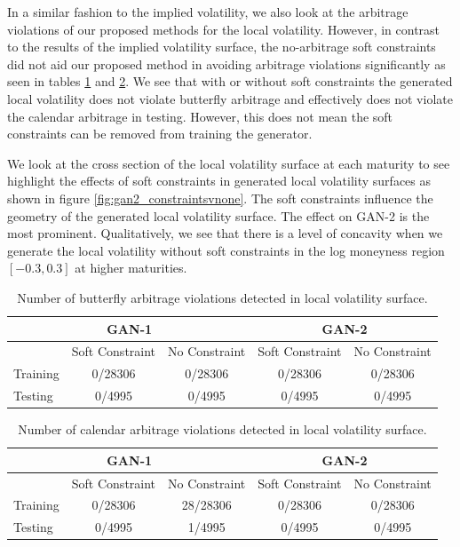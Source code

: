 \documentclass{article}
\theoremstyle{plain}%
\theoremstyle{definition}
\theoremstyle{remark}
\begin{document}
In a similar fashion to the implied volatility, we also look at the arbitrage violations of our proposed methods for the local volatility. However, in contrast to the results of the implied volatility surface, the no-arbitrage soft constraints did not aid our proposed method in avoiding arbitrage violations significantly as seen in tables \ref{tab:butterfly_arbitrage_violations_loc_vol} and \ref{tab:calendar_arbitrage_violation_loc_vols}. We see that with or without soft constraints the generated local volatility does not violate butterfly arbitrage and effectively does not violate the calendar arbitrage in testing. However, this does not mean the soft constraints can be removed from training the generator. 

We look at the cross section of the local volatility surface at each maturity to see highlight the effects of soft constraints in generated local volatility surfaces as shown in figure \ref{fig:gan2_constraintsvnone}. The soft constraints influence the geometry of the generated local volatility surface. The effect on GAN-2 is the most prominent. Qualitatively, we see that there is a level of concavity when we generate the local volatility without soft constraints in the log moneyness region $[-0.3,0.3]$ at higher maturities. 

\begin{table}[htbp]
\centering
\caption{Number of butterfly arbitrage violations detected in local volatility surface.}
\begin{tabular}{lcccc}
\hline
\multicolumn{3}{c}{\textbf{GAN-1}} & \multicolumn{2}{c}{\textbf{GAN-2}} \\
\hline
& Soft Constraint & No Constraint & Soft Constraint & No Constraint \\
\hline
Training & 0/28306 & 0/28306 & 0/28306 & 0/28306 \\
Testing & 0/4995 & 0/4995 & 0/4995 & 0/4995 \\
\hline
\end{tabular}
\label{tab:butterfly_arbitrage_violations_loc_vol}
\end{table}

\begin{table}[htbp]
\centering
\caption{Number of calendar arbitrage violations detected in local volatility surface.}
\begin{tabular}{lcccc}
\hline
\multicolumn{3}{c}{\textbf{GAN-1}} & \multicolumn{2}{c}{\textbf{GAN-2}} \\
\hline
& Soft Constraint & No Constraint & Soft Constraint & No Constraint \\
\hline
Training & 0/28306 & 28/28306 & 0/28306 & 0/28306 \\
Testing & 0/4995 & 1/4995 & 0/4995 & 0/4995 \\
\hline
\end{tabular}
\label{tab:calendar_arbitrage_violation_loc_vols}
\end{table}
\end{document}
